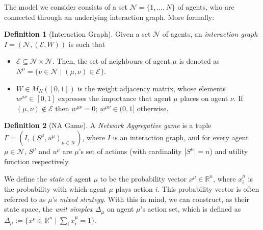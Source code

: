 \documentclass{article}
\theoremstyle{definition}
\newtheorem{definition}{Definition}
\newcommand{\agentset}{\mathcal{N}}
\newcommand{\edgeset}{\mathcal{E}}
\newcommand{\weightset}{W}
\newcommand{\actionset}[1]{S^{#1}}
\newcommand{\utility}[1]{u^{#1}}
\newcommand{\wmunu}{w^{\mu \nu}}
\newcommand{\xmu}{x^{\mu}}
\newcommand{\xmuaction}[1]{x^{\mu}_{#1}}
\begin{document}
The model we consider consists of
a set $\agentset = \{1,
\ldots , N \}$ of agents, who are connected through an underlying
interaction graph.
More formally:
%        
\begin{definition}[Interaction Graph] \label{interactiongraph}
	Given a set  $\agentset$ of agents, an {\em interaction graph} $I = (\agentset, (\edgeset,
	\weightset))$ is such that
	\begin{itemize}[leftmargin=0.5cm]
		
		\item $\edgeset \subseteq \agentset \times \agentset$.  Then, the set of
		neighbours of agent $\mu$ is denoted as $N^\mu = \{\nu \in
		\agentset \mid (\mu, \nu) \in \edgeset\}$.
		
		\item $\weightset \in M_N([0, 1])$ is the weight adjacency matrix, whose elements $w^{\mu
			\nu} \in [0, 1]$ expresses the importance that agent $\mu$ places on agent $\nu$. If $(\mu, \nu) \not
		\in \edgeset$ then $w^{\mu \nu} = 0$;        $\wmunu \in (0, 1]$ otherwise.
	\end{itemize}
\end{definition}

%
\begin{definition}[NA Game]
	A {\em Network Aggregative game} is
	a tuple $\Gamma = (I, (\actionset{\mu},
	\utility{\mu})_{\mu \in \mathcal{N}})$, where $I$ is an
	interaction graph, and for every agent $\mu \in \mathcal{N}$, $\actionset{\mu}$ and $\utility{\mu}$
	are $\mu$'s set of actions (with cardinality $|\actionset{\mu}| = n$)
	and utility function respectively.
\end{definition}

We define the \emph{state} of agent $\mu$ to be the probability
vector $\xmu \in \mathbb{R}^n$, where $\xmu_i$ is the probability
with which agent $\mu$ plays action $i$.
This
probability vector is often referred to as $\mu$'s \emph{mixed
	strategy}. With this in mind, we can construct, as their state
space, the {\em unit simplex} $\Delta_\mu$ on agent $\mu$'s action set, which
is defined
as $\Delta_\mu := \{\xmu \in \mathbb{R}^n \mid \sum_i
\xmuaction{i} = 1\}$. 
\end{document}
